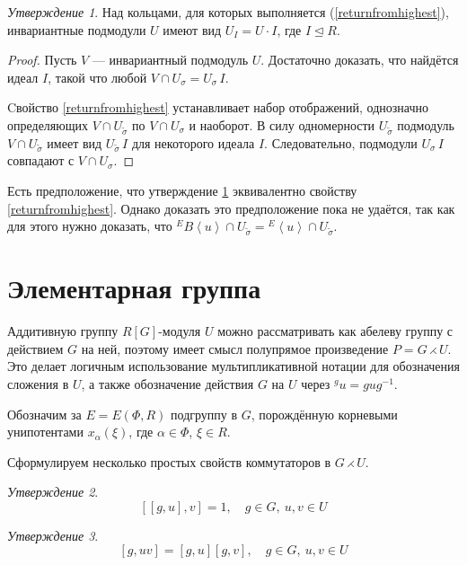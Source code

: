 \documentclass[10pt]{article}
\theoremstyle{break}
\theoremstyle{remark}
\newtheorem{prop}{Утверждение}
\begin{document}
\begin{prop}\label{unipotentsubgroups}
Над кольцами, для которых выполняется (\ref{returnfromhighest}), инвариантные подмодули $U$ имеют вид $U_I = U \cdot I$, где $I \trianglelefteq R$.
\end{prop}
\begin{proof}
Пусть $V$ --- инвариантный подмодуль $U$. Достаточно доказать, что найдётся идеал $I$, такой что любой $V \cap U_\sigma = U_\sigma \, I$.

Cвойство \ref{returnfromhighest} устанавливает набор отображений, однозначно определяющих $V \cap U_{\widetilde\sigma}$ по $V \cap U_\sigma$ и наоборот. В силу одномерности $U_{\widetilde\sigma}$ подмодуль $V \cap U_{\widetilde\sigma}$ имеет вид $U_{\widetilde\sigma} \, I$ для некоторого идеала $I$. Следовательно, подмодули $U_{\sigma} \, I$ совпадают с $V \cap U_\sigma$.
\end{proof}

Есть предположение, что утверждение \ref{unipotentsubgroups} эквивалентно свойству \ref{returnfromhighest}. Однако доказать это предположение пока не удаётся, так как для этого нужно доказать, что ${}^EB\left<u\right> \cap U_{\widetilde\sigma} = {}^E\left<u\right> \cap U_{\widetilde\sigma}$.


\section{Элементарная группа}

Аддитивную группу $R[G]$-модуля $U$ можно рассматривать как абелеву группу с действием $G$ на ней, поэтому
имеет смысл полупрямое произведение $P = G \rightthreetimes U$.
Это делает логичным использование мультипликативной нотации для обозначения сложения в $U$, а также обозначение действия $G$ на $U$ через $^{g}u = g u g^{-1}$. 

Обозначим за $E = E(\Phi,R)$ подгруппу в $G$, порождённую корневыми унипотентами $x_\alpha(\xi)$, где $\alpha \in \Phi$, $\xi \in R$.

Сформулируем несколько простых свойств коммутаторов в $G \rightthreetimes U$.

\begin{prop}
  $$[[g,u],v] = 1, \quad g \in G, \ u,v \in U $$
\end{prop}

\begin{prop}
  $$[g,uv] = [g,u][g,v], \quad g \in G, \ u,v \in U $$
\end{prop}
\end{document}
